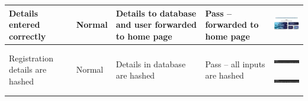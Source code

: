 \begin{center}
\begin{longtable}{|P{23mm}|P{20mm}|P{19mm}|P{20mm}|P{54mm}|}
Details entered correctly & Normal & Details to database and user
forwarded to home page & Pass -- forwarded to home page &
\includegraphics[width=51mm]{ch4_testing_for_eval/media/image6.png} \\ \hline
Registration details are hashed & Normal & Details in database are
hashed & Pass -- all inputs are hashed &
\includegraphics[width=51mm]{ch4_testing_for_eval/media/image7.png}

\includegraphics[width=51mm]{ch4_testing_for_eval/media/image8.png}


\end{longtable}
\end{center}
